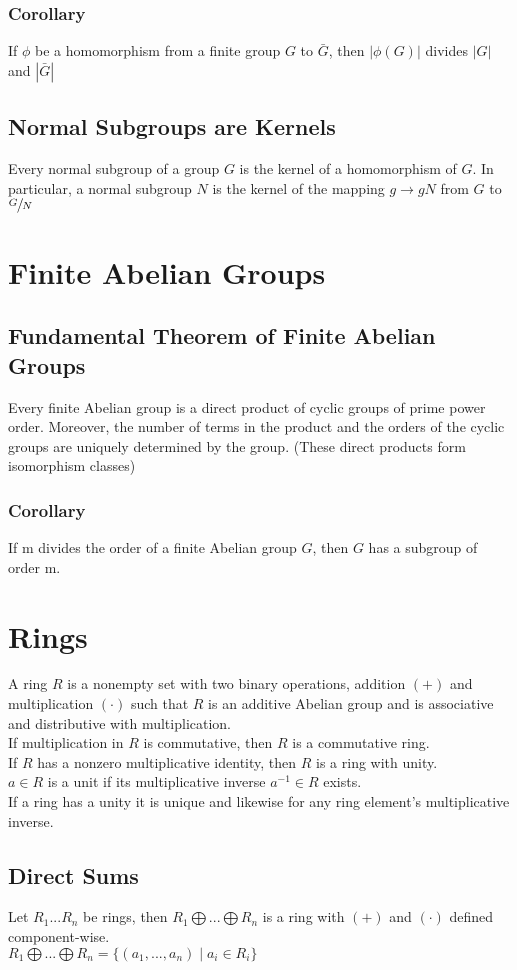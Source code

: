 \documentclass{article}
\begin{document}
\subsubsection{Corollary}
If $\phi$ be a homomorphism from a finite group $G$ to $\bar{G}$, then $|\phi(G)|$ divides $|G|$ and $|\bar{G}|$
\subsection{Normal Subgroups are Kernels}
Every normal subgroup of a group $G$ is the kernel of a homomorphism of $G$. In particular, a normal subgroup $N$ is the kernel of the mapping $g \to gN$ from $G$ to $\sfrac{G}{N}$


\section{Finite Abelian Groups}
\subsection{Fundamental Theorem of Finite Abelian Groups}
Every finite Abelian group is a direct product of cyclic groups of prime power order. Moreover, the number of terms in the product and the orders of the cyclic groups are uniquely determined by the group. (These direct products form isomorphism classes)
\subsubsection{Corollary}
If m divides the order of a finite Abelian group $G$, then $G$ has a subgroup of order m.


\section{Rings}
A ring $R$ is a nonempty set with two binary operations, addition $(+)$ and multiplication $(\cdot)$ such that $R$ is an additive Abelian group and is associative and distributive with multiplication. \\
If multiplication in $R$ is commutative, then $R$ is a commutative ring. \\
If $R$ has a nonzero multiplicative identity, then $R$ is a ring with unity. \\
$a \in R$ is a unit if its multiplicative inverse $a^{-1} \in R$ exists. \\
If a ring has a unity it is unique and likewise for any ring element's multiplicative inverse.
\subsection{Direct Sums}
Let $R_1 ... R_n$ be rings, then $R_1 \bigoplus ... \bigoplus R_n$ is a ring with $(+)$ and $(\cdot)$ defined component-wise. \\
$R_1 \bigoplus ... \bigoplus R_n = \{(a_1, ..., a_n) \mid a_i \in R_i\}$
\end{document}
